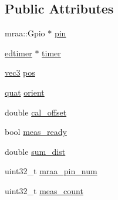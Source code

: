 \subsection*{Public Attributes}
\begin{DoxyCompactItemize}
\item 
mraa\-::\-Gpio $\ast$ \hyperlink{structedpl__system_1_1pl__gpio_a234539725c2d45835f0debcac9fa36d5}{pin}
\item 
\hyperlink{classedtimer}{edtimer} $\ast$ \hyperlink{structedpl__system_1_1pl__gpio_a7508563924e13b4776f2c659987f8bbe}{timer}
\item 
\hyperlink{nsmath_8h_a14bb8a4a0fefc0be4fae32fc59a07362}{vec3} \hyperlink{structedpl__system_1_1pl__gpio_ae594b7de5246feec7d01bd07f495ea80}{pos}
\item 
\hyperlink{nsmath_8h_aa07476c74d8e3787a771c94c92354496}{quat} \hyperlink{structedpl__system_1_1pl__gpio_a90e813786d78ee35fdb83d1a7102ede1}{orient}
\item 
double \hyperlink{structedpl__system_1_1pl__gpio_aec767567a7e6cd84047a2d05713caaac}{cal\-\_\-offset}
\item 
bool \hyperlink{structedpl__system_1_1pl__gpio_a6bdbec576fb7ee451b43c578510ccedc}{meas\-\_\-ready}
\item 
double \hyperlink{structedpl__system_1_1pl__gpio_aeabebbe081b66877ac1c18040ffec58c}{sum\-\_\-dist}
\item 
uint32\-\_\-t \hyperlink{structedpl__system_1_1pl__gpio_a6303dfb8b2c4d06206ad3b4ef25237b2}{mraa\-\_\-pin\-\_\-num}
\item 
uint32\-\_\-t \hyperlink{structedpl__system_1_1pl__gpio_a592c378d6b5e33b8743279c94e292d47}{meas\-\_\-count}
\end{DoxyCompactItemize}


